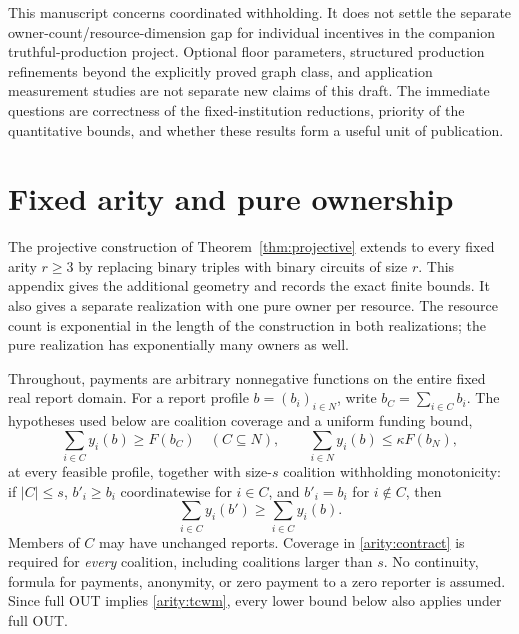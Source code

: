 \documentclass[11pt]{article}
\theoremstyle{definition}\newtheorem{definition}[theorem]{Definition}
\theoremstyle{remark}\newtheorem{remark}[theorem]{Remark}
\begin{document}
This manuscript concerns coordinated withholding. It does not settle the
separate owner-count/resource-dimension gap for individual incentives in the
companion truthful-production project. Optional floor parameters, structured
production refinements beyond the explicitly proved graph class, and application
measurement studies are not separate new claims of this draft. The immediate questions are correctness of the
fixed-institution reductions, priority of the quantitative bounds, and whether
these results form a useful unit of publication.

\appendix
\section{Fixed arity and pure ownership}
\label{sec:arity}
\label{arity:appendix}

The projective construction of Theorem~\ref{thm:projective} extends to every
fixed arity $r\geq 3$ by
replacing binary triples with binary circuits of size $r$.  This appendix
gives the additional geometry and records the exact finite bounds.  It also
gives a separate realization with one pure owner per resource.  The resource
count is exponential in the length of the construction in both realizations;
the pure realization has exponentially many owners as well.

Throughout, payments are arbitrary nonnegative functions on the entire fixed
real report domain.  For a report profile $b=(b_i)_{i\in N}$, write
$b_C=\sum_{i\in C}b_i$.  The hypotheses used below are coalition coverage and
a uniform funding bound,
\begin{equation}
  \sum_{i\in C}y_i(b)\geq F(b_C)\quad(C\subseteq N),
  \qquad
  \sum_{i\in N}y_i(b)\leq\kappa F(b_N),
  \label{arity:contract}
\end{equation}
at every feasible profile, together with size-$s$ coalition withholding
monotonicity: if $|C|\leq s$, $b'_i\geq b_i$ coordinatewise for $i\in C$,
and $b'_i=b_i$ for $i\notin C$, then
\begin{equation}
  \sum_{i\in C}y_i(b')\geq\sum_{i\in C}y_i(b).
  \label{arity:tcwm}
\end{equation}
Members of $C$ may have unchanged reports.  Coverage in
\eqref{arity:contract} is required for \emph{every} coalition, including
coalitions larger than $s$.  No continuity, formula for payments, anonymity,
or zero payment to a zero reporter is assumed.  Since full OUT implies
\eqref{arity:tcwm}, every lower bound below also applies under full OUT.
\end{document}

